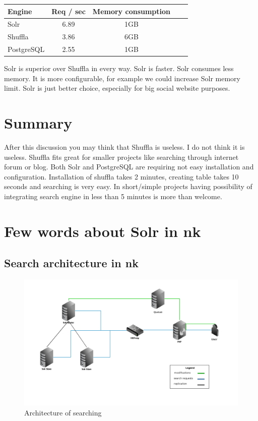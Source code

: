 \documentclass[10pt,a4paper]{article}
\begin{document}
\begin{tabular}{|l|c|c|c|c|}
\hline Engine & Req / sec & Memory consumption \\
\hline Solr & 6.89 & 1GB \\
\hline Shuffla & 3.86 & 6GB  \\
\hline PostgreSQL & 2.55 & 1GB \\
\hline 
\end{tabular}

Solr is superior over Shuffla in every way. Solr is faster. Solr consumes less memory. It is more configurable, for example we could increase Solr memory limit. Solr is just better choice, especially for big social website purposes. 

\section{Summary}

After this discussion you may think that Shuffla is useless. I do not think it is useless. Shuffla fits great for smaller projects like searching through internet forum or blog. Both Solr and PostgreSQL are requiring not easy installation and configuration. Installation of shuffla takes 2 minutes, creating table takes 10 seconds and searching is very easy. In short/simple projects having possibility of integrating search engine in less than 5 minutes is more than welcome.

\section{Few words about Solr in nk}

\subsection{Search architecture in nk}

\begin{figure}
\centering
  \includegraphics[width=12cm]{architektura_wyszukiwania}
  \caption{Architecture of searching}
  \label{fig:architektura_wyszukiwania}
\end{figure}
\end{document}
